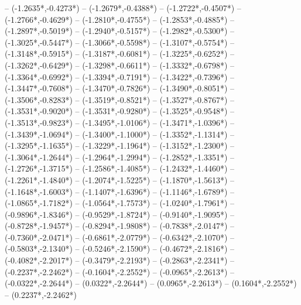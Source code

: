 {	-- ({-1.2635*\dx},{-0.4273*\dy})
	-- ({-1.2679*\dx},{-0.4388*\dy})
	-- ({-1.2722*\dx},{-0.4507*\dy})
	-- ({-1.2766*\dx},{-0.4629*\dy})
	-- ({-1.2810*\dx},{-0.4755*\dy})
	-- ({-1.2853*\dx},{-0.4885*\dy})
	-- ({-1.2897*\dx},{-0.5019*\dy})
	-- ({-1.2940*\dx},{-0.5157*\dy})
	-- ({-1.2982*\dx},{-0.5300*\dy})
	-- ({-1.3025*\dx},{-0.5447*\dy})
	-- ({-1.3066*\dx},{-0.5598*\dy})
	-- ({-1.3107*\dx},{-0.5754*\dy})
	-- ({-1.3148*\dx},{-0.5915*\dy})
	-- ({-1.3187*\dx},{-0.6081*\dy})
	-- ({-1.3225*\dx},{-0.6252*\dy})
	-- ({-1.3262*\dx},{-0.6429*\dy})
	-- ({-1.3298*\dx},{-0.6611*\dy})
	-- ({-1.3332*\dx},{-0.6798*\dy})
	-- ({-1.3364*\dx},{-0.6992*\dy})
	-- ({-1.3394*\dx},{-0.7191*\dy})
	-- ({-1.3422*\dx},{-0.7396*\dy})
	-- ({-1.3447*\dx},{-0.7608*\dy})
	-- ({-1.3470*\dx},{-0.7826*\dy})
	-- ({-1.3490*\dx},{-0.8051*\dy})
	-- ({-1.3506*\dx},{-0.8283*\dy})
	-- ({-1.3519*\dx},{-0.8521*\dy})
	-- ({-1.3527*\dx},{-0.8767*\dy})
	-- ({-1.3531*\dx},{-0.9020*\dy})
	-- ({-1.3531*\dx},{-0.9280*\dy})
	-- ({-1.3525*\dx},{-0.9548*\dy})
	-- ({-1.3513*\dx},{-0.9823*\dy})
	-- ({-1.3495*\dx},{-1.0106*\dy})
	-- ({-1.3471*\dx},{-1.0396*\dy})
	-- ({-1.3439*\dx},{-1.0694*\dy})
	-- ({-1.3400*\dx},{-1.1000*\dy})
	-- ({-1.3352*\dx},{-1.1314*\dy})
	-- ({-1.3295*\dx},{-1.1635*\dy})
	-- ({-1.3229*\dx},{-1.1964*\dy})
	-- ({-1.3152*\dx},{-1.2300*\dy})
	-- ({-1.3064*\dx},{-1.2644*\dy})
	-- ({-1.2964*\dx},{-1.2994*\dy})
	-- ({-1.2852*\dx},{-1.3351*\dy})
	-- ({-1.2726*\dx},{-1.3715*\dy})
	-- ({-1.2586*\dx},{-1.4085*\dy})
	-- ({-1.2432*\dx},{-1.4460*\dy})
	-- ({-1.2261*\dx},{-1.4840*\dy})
	-- ({-1.2074*\dx},{-1.5225*\dy})
	-- ({-1.1870*\dx},{-1.5613*\dy})
	-- ({-1.1648*\dx},{-1.6003*\dy})
	-- ({-1.1407*\dx},{-1.6396*\dy})
	-- ({-1.1146*\dx},{-1.6789*\dy})
	-- ({-1.0865*\dx},{-1.7182*\dy})
	-- ({-1.0564*\dx},{-1.7573*\dy})
	-- ({-1.0240*\dx},{-1.7961*\dy})
	-- ({-0.9896*\dx},{-1.8346*\dy})
	-- ({-0.9529*\dx},{-1.8724*\dy})
	-- ({-0.9140*\dx},{-1.9095*\dy})
	-- ({-0.8728*\dx},{-1.9457*\dy})
	-- ({-0.8294*\dx},{-1.9808*\dy})
	-- ({-0.7838*\dx},{-2.0147*\dy})
	-- ({-0.7360*\dx},{-2.0471*\dy})
	-- ({-0.6861*\dx},{-2.0779*\dy})
	-- ({-0.6342*\dx},{-2.1070*\dy})
	-- ({-0.5803*\dx},{-2.1340*\dy})
	-- ({-0.5246*\dx},{-2.1590*\dy})
	-- ({-0.4672*\dx},{-2.1816*\dy})
	-- ({-0.4082*\dx},{-2.2017*\dy})
	-- ({-0.3479*\dx},{-2.2193*\dy})
	-- ({-0.2863*\dx},{-2.2341*\dy})
	-- ({-0.2237*\dx},{-2.2462*\dy})
	-- ({-0.1604*\dx},{-2.2552*\dy})
	-- ({-0.0965*\dx},{-2.2613*\dy})
	-- ({-0.0322*\dx},{-2.2644*\dy})
	-- ({0.0322*\dx},{-2.2644*\dy})
	-- ({0.0965*\dx},{-2.2613*\dy})
	-- ({0.1604*\dx},{-2.2552*\dy})
	-- ({0.2237*\dx},{-2.2462*\dy})
}
